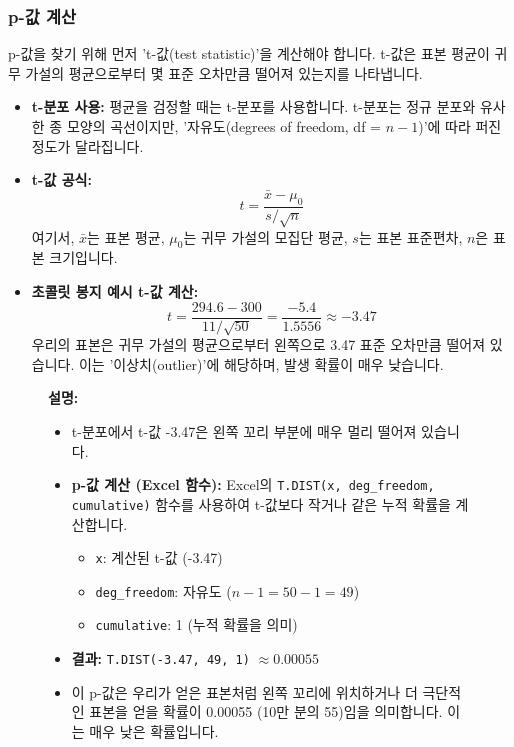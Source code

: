 \documentclass[11pt,a4paper]{article}
\theoremstyle{definition}
\begin{document}
\subsubsection*{p-값 계산}

p-값을 찾기 위해 먼저 't-값(test statistic)'을 계산해야 합니다. t-값은 표본 평균이 귀무 가설의 평균으로부터 몇 표준 오차만큼 떨어져 있는지를 나타냅니다.

\begin{itemize}
    \item \textbf{t-분포 사용:} 평균을 검정할 때는 t-분포를 사용합니다. t-분포는 정규 분포와 유사한 종 모양의 곡선이지만, '자유도(degrees of freedom, df = $n-1$)'에 따라 퍼진 정도가 달라집니다.
    \item \textbf{t-값 공식:}
    \[ t = \frac{\bar{x} - \mu_0}{s / \sqrt{n}} \]
    여기서, $\bar{x}$는 표본 평균, $\mu_0$는 귀무 가설의 모집단 평균, $s$는 표본 표준편차, $n$은 표본 크기입니다.
    \item \textbf{초콜릿 봉지 예시 t-값 계산:}
    \[ t = \frac{294.6 - 300}{11 / \sqrt{50}} = \frac{-5.4}{1.5556} \approx -3.47 \]
    우리의 표본은 귀무 가설의 평균으로부터 왼쪽으로 3.47 표준 오차만큼 떨어져 있습니다. 이는 '이상치(outlier)'에 해당하며, 발생 확률이 매우 낮습니다.
\end{itemize}

\begin{figure}[h!]
    \centering
    \label{fig:t_value_location}
    \vspace{0.5em}
    \textbf{설명:}
    \begin{itemize}
        \item t-분포에서 t-값 -3.47은 왼쪽 꼬리 부분에 매우 멀리 떨어져 있습니다.
        \item \textbf{p-값 계산 (Excel 함수):} Excel의 \texttt{T.DIST(x, deg_freedom, cumulative)} 함수를 사용하여 t-값보다 작거나 같은 누적 확률을 계산합니다.
        \begin{itemize}
            \item \texttt{x}: 계산된 t-값 (-3.47)
            \item \texttt{deg_freedom}: 자유도 ($n-1 = 50-1 = 49$)
            \item \texttt{cumulative}: 1 (누적 확률을 의미)
        \end{itemize}
        \item \textbf{결과:} \texttt{T.DIST(-3.47, 49, 1)} $\approx 0.00055$
        \item 이 p-값은 우리가 얻은 표본처럼 왼쪽 꼬리에 위치하거나 더 극단적인 표본을 얻을 확률이 0.00055 (10만 분의 55)임을 의미합니다. 이는 매우 낮은 확률입니다.
    \end{itemize}
\end{figure}
\end{document}
